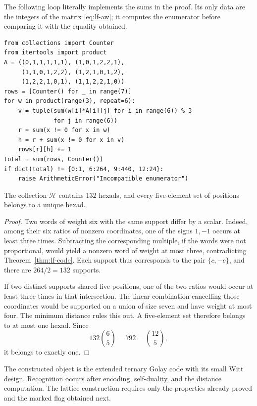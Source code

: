 \begin{remark}
The following loop literally implements the sums in the proof.
Its only data are the integers of the matrix
\eqref{eq:lf-aw}; it computes the enumerator before comparing it with
the equality obtained.
\end{remark}
{\small
\begin{verbatim}
from collections import Counter
from itertools import product
A = ((0,1,1,1,1,1), (1,0,1,2,2,1),
     (1,1,0,1,2,2), (1,2,1,0,1,2),
     (1,2,2,1,0,1), (1,1,2,2,1,0))
rows = [Counter() for _ in range(7)]
for w in product(range(3), repeat=6):
    v = tuple(sum(w[i]*A[i][j] for i in range(6)) % 3
              for j in range(6))
    r = sum(x != 0 for x in w)
    h = r + sum(x != 0 for x in v)
    rows[r][h] += 1
total = sum(rows, Counter())
if dict(total) != {0:1, 6:264, 9:440, 12:24}:
    raise ArithmeticError("Incompatible enumerator")
\end{verbatim}
}

\begin{proposition}
\label{prop:lf-witt}
The collection \(\mathcal H\) contains \(132\) hexads, and every
five-element set of positions belongs to a unique hexad.
\end{proposition}
\begin{proof}
Two words of weight six with the same support differ by
a scalar. Indeed, among their six ratios of nonzero
coordinates, one of the signs \(1,-1\) occurs at least three
times. Subtracting the corresponding multiple, if the words
were not proportional, would yield a nonzero word
of weight at most three, contradicting
Theorem~\ref{thm:lf-code}. Each support thus corresponds to
the pair \(\{c,-c\}\), and there are \(264/2=132\) supports.

If two distinct supports shared five positions,
one of the two ratios would occur at least three times
in that intersection. The linear combination cancelling those
coordinates would be supported on a union of size seven
and have weight at most four. The minimum distance rules this out.
A five-element set therefore belongs to at most one hexad.
Since
\[
 132\binom65=792=\binom{12}{5},
\]
it belongs to exactly one.
\end{proof}

The constructed object is the extended ternary Golay code
with its small Witt design. Recognition occurs
after encoding, self-duality, and the distance
computation. The lattice construction requires only
the properties already proved and the marked flag
obtained next.

